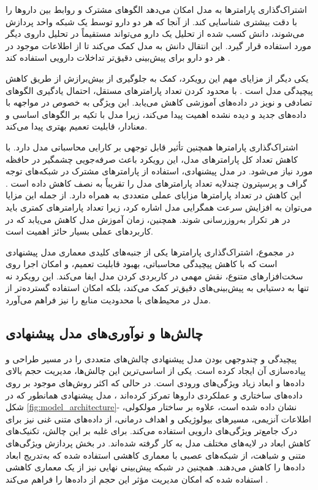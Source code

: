 اشتراک‌گذاری پارامترها به مدل امکان می‌دهد الگوهای مشترک و روابط بین داروها را با دقت بیشتری شناسایی کند. از آنجا که هر دو دارو توسط یک شبکه واحد پردازش می‌شوند، دانش کسب شده از تحلیل یک دارو می‌تواند مستقیماً در تحلیل داروی دیگر مورد استفاده قرار گیرد. این انتقال دانش به مدل کمک می‌کند تا از اطلاعات موجود در هر دو دارو برای پیش‌بینی دقیق‌تر تداخلات دارویی استفاده کند \cite{ref_deng2020}.

یکی دیگر از مزایای مهم این رویکرد، کمک به جلوگیری از بیش‌برازش از طریق کاهش پیچیدگی مدل است \cite{ref_xu2019}. با محدود کردن تعداد پارامترهای مستقل، احتمال یادگیری الگوهای تصادفی و نویز در داده‌های آموزشی کاهش می‌یابد. این ویژگی به خصوص در مواجهه با داده‌های جدید و دیده نشده اهمیت پیدا می‌کند، زیرا مدل با تکیه بر الگوهای اساسی و معنادار، قابلیت تعمیم بهتری پیدا می‌کند.

اشتراک‌گذاری پارامترها همچنین تأثیر قابل توجهی بر کارایی محاسباتی مدل دارد. با کاهش تعداد کل پارامترهای مدل، این رویکرد باعث صرفه‌جویی چشمگیر در حافظه مورد نیاز می‌شود. در مدل پیشنهادی، استفاده از پارامترهای مشترک در شبکه‌های توجه گراف و پرسپترون چندلایه تعداد پارامترهای مدل را تقریباً به نصف کاهش داده است \cite{ref_dai2020}. این کاهش در تعداد پارامترها مزایای عملی متعددی به همراه دارد. از جمله این مزایا می‌توان به افزایش سرعت همگرایی مدل اشاره کرد، زیرا تعداد پارامترهای کمتری باید در هر تکرار به‌روزرسانی شوند. همچنین، زمان آموزش مدل کاهش می‌یابد که در کاربردهای عملی بسیار حائز اهمیت است.

در مجموع، اشتراک‌گذاری پارامترها یکی از جنبه‌های کلیدی معماری مدل پیشنهادی است که با کاهش پیچیدگی محاسباتی، بهبود قابلیت تعمیم، و امکان اجرا روی سخت‌افزارهای متنوع، نقش مهمی در کاربردی کردن مدل ایفا می‌کند. این رویکرد نه تنها به دستیابی به پیش‌بینی‌های دقیق‌تر کمک می‌کند، بلکه امکان استفاده گسترده‌تر از مدل در محیط‌های با محدودیت منابع را نیز فراهم می‌آورد.

\subsection{چالش‌ها و نوآوری‌های مدل پیشنهادی}

پیچیدگی و چندوجهی بودن مدل پیشنهادی چالش‌های متعددی را در مسیر طراحی و پیاده‌سازی آن ایجاد کرده است. یکی از اساسی‌ترین این چالش‌ها، مدیریت حجم بالای داده‌ها و ابعاد زیاد ویژگی‌های ورودی است. در حالی که اکثر روش‌های موجود بر روی داده‌های ساختاری و عملکردی داروها تمرکز کرده‌اند \cite{ref_deng2020, ref_shi2024}، مدل پیشنهادی همانطور که در شکل \ref{fig:model_architecture}- نشان داده شده است، علاوه بر ساختار مولکولی، اطلاعات آنزیمی، مسیرهای بیولوژیکی و اهداف درمانی، از داده‌های متنی غنی نیز برای درک جامع‌تر ویژگی‌های دارویی استفاده می‌کند. برای غلبه بر این چالش، تکنیک‌های کاهش ابعاد در لایه‌های مختلف مدل به کار گرفته شده‌اند. در بخش پردازش ویژگی‌های متنی و شباهت، از شبکه‌های عصبی با معماری کاهشی استفاده شده که به‌تدریج ابعاد داده‌ها را کاهش می‌دهند. همچنین در شبکه پیش‌بینی نهایی نیز از یک معماری کاهشی استفاده شده که امکان مدیریت مؤثر این حجم از داده‌ها را فراهم می‌کند \cite{ref_dai2020}.

